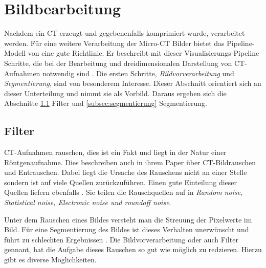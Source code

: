 \section{Bildbearbeitung}
\label{sec:bildbearbeitung} Nachdem ein CT erzeugt und gegebenenfalls komprimiert
wurde, verarbeitet werden. Für eine weitere Verarbeitung der Micro-CT Bilder bietet
das Pipeline-Modell von \citet[Seite 50]{handels2000} eine gute Richtlinie. Er
beschreibt mit dieser Visualisierungs-Pipeline Schritte, die bei der Bearbeitung
und dreidimensionalen Darstellung von CT-Aufnahmen notwendig sind \citep[vgl.][Seite
50]{handels2000}. Die ersten Schritte, \textit{Bildvorverarbeitung} und \textit{Segmentierung},
sind von besonderem Interesse. Dieser Abschnitt orientiert sich an dieser Unterteilung
und nimmt sie als Vorbild. Daraus ergeben sich die Abschnitte
\ref{subsec:filter} Filter und \ref{subsec:segmentierung} Segmentierung.

\subsection{Filter}
\label{subsec:filter} CT-Aufnahmen rauschen, dies ist ein Fakt und liegt in der Natur
einer Röntgenaufnahme. Dies beschreiben auch \citet[Kapitel 3]{diwakar2018} in
ihrem Paper über CT-Bildrauschen und Entrauschen. Dabei liegt die Ursache des Rauschens
nicht an einer Stelle sondern ist auf viele Quellen zurückzuführen. Einen gute
Einteilung dieser Quellen liefern ebenfalls \citet[Kapitel 3]{diwakar2018}. Sie teilen
die Rauschquellen auf in \textit{Random noise, Statistical noise, Electronic
noise und roundoff noise}.

Unter dem Rauschen eines Bildes versteht man die Streuung der Pixelwerte im Bild.
Für eine Segmentierung des Bildes ist dieses Verhalten unerwünscht und führt zu schlechten
Ergebnissen \citep[vgl.][Seite 51]{handels2000}. Die Bildvorverarbeitung oder
auch Filter gennant, hat die Aufgabe dieses Rauschen so gut wie möglich zu redzieren.
Hierzu gibt es diverse Möglichkeiten.

